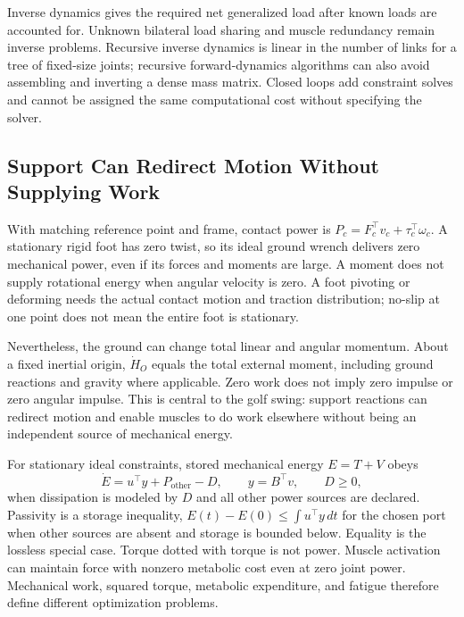 Inverse dynamics gives the required net generalized load after known loads are accounted for. Unknown bilateral load sharing and muscle redundancy remain inverse problems. Recursive inverse dynamics is linear in the number of links for a tree of fixed-size joints; recursive forward-dynamics algorithms can also avoid assembling and inverting a dense mass matrix. Closed loops add constraint solves and cannot be assigned the same computational cost without specifying the solver.

\subsection{Support Can Redirect Motion Without Supplying Work}

With matching reference point and frame, contact power is $P_c=F_c^\top v_c+\tau_c^\top\omega_c$. A stationary rigid foot has zero twist, so its ideal ground wrench delivers zero mechanical power, even if its forces and moments are large. A moment does not supply rotational energy when angular velocity is zero. A foot pivoting or deforming needs the actual contact motion and traction distribution; no-slip at one point does not mean the entire foot is stationary.

Nevertheless, the ground can change total linear and angular momentum. About a fixed inertial origin, $\dot H_O$ equals the total external moment, including ground reactions and gravity where applicable. Zero work does not imply zero impulse or zero angular impulse. This is central to the golf swing: support reactions can redirect motion and enable muscles to do work elsewhere without being an independent source of mechanical energy.

For stationary ideal constraints, stored mechanical energy $E=T+V$ obeys
\begin{equation}
 \dot E=u^\top y+P_{\mathrm{other}}-D,\qquad y=B^\top v,\qquad D\ge0,
 \label{eq:ch9:passivity}
\end{equation}
when dissipation is modeled by $D$ and all other power sources are declared. Passivity is a storage inequality, $E(t)-E(0)\le\int u^\top y\,dt$ for the chosen port when other sources are absent and storage is bounded below. Equality is the lossless special case. Torque dotted with torque is not power. Muscle activation can maintain force with nonzero metabolic cost even at zero joint power. Mechanical work, squared torque, metabolic expenditure, and fatigue therefore define different optimization problems.

